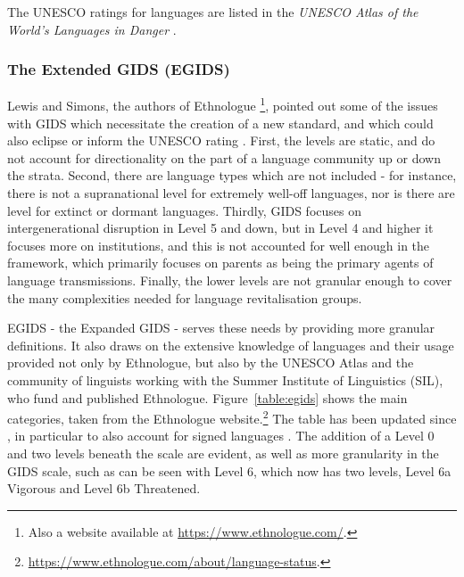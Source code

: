 The UNESCO ratings for languages are listed in the \textit{UNESCO Atlas of the World's Languages in Danger} \citep{unesco2014unesco}.

\subsubsection{The Extended GIDS (EGIDS)}

Lewis and Simons, the authors of Ethnologue \citep{lewis2009ethnologue}\footnote{Also a website available at \href{https://www.ethnologue.com/}{https://www.ethnologue.com/}. }, pointed out some of the issues with GIDS which necessitate the creation of a new standard, and which could also eclipse or inform the UNESCO rating \citep{lewis2010assessing}. First, the levels are static, and do not account for directionality on the part of a language community up or down the strata. Second, there are language types which are not included - for instance, there is not a supranational level for extremely well-off languages, nor is there are level for extinct or dormant languages. Thirdly, GIDS focuses on intergenerational disruption in Level 5 and down, but in Level 4 and higher it focuses more on institutions, and this is not accounted for well enough in the framework, which primarily focuses on parents as being the primary agents of language transmissions. Finally, the lower levels are not granular enough to cover the many complexities needed for language revitalisation groups.

EGIDS - the Expanded GIDS - serves these needs by providing more granular definitions. It also draws on the extensive knowledge of languages and their usage provided not only by Ethnologue, but also by the UNESCO Atlas and the community of linguists working with the Summer Institute of Linguistics (SIL), who fund and published Ethnologue. Figure~\ref{table:egids} shows the main categories, taken from the Ethnologue website.\footnote{\href{https://www.ethnologue.com/about/language-status}{https://www.ethnologue.com/about/language-status}. } The table has been updated since \citet{lewis2010assessing}, in particular to also account for signed languages \citep{bickford2015rating}. The addition of a Level 0 and two levels beneath the scale are evident, as well as more granularity in the GIDS scale, such as can be seen with Level 6, which now has two levels, Level 6a Vigorous and Level 6b Threatened.

